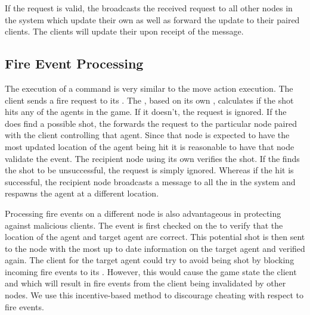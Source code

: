 	If the request is valid, the \localServer broadcasts the received request to all other nodes in the system which update their own \gamestate as well as forward the update to their paired clients. The clients will update their \gamestate upon receipt of the message.

\subsection{Fire Event Processing}

	The execution of a \fire{\position}{\direction} command is very similar to the move action execution. The client sends a fire request to its \localServer. The \localServer, based on its own \gamestate, calculates if the shot hits any of the agents in the game. If it doesn't, the request is ignored. If the \localServer does find a possible shot, the \localServer forwards the request to the particular node paired with the client controlling that agent. Since that node is expected to have the most updated location of the agent being hit it is reasonable to have that node validate the event. The recipient node using its own \gamestate verifies the shot. If the \localServer finds the shot to be unsuccessful, the request is simply ignored. Whereas if the hit is successful, the recipient node broadcasts a  message to all the \localServers in the system and respawns the agent at a different location.
	
	Processing fire events on a different node is also advantageous in protecting against malicious clients. The event is first checked on the \localServer to verify that the location of the agent and target agent are correct. This potential shot is then sent to the node with the most up to date information on the target agent and verified again. The client for the target agent could try to avoid being shot by blocking incoming fire events to its \localServer. However, this would cause the game state the client and \localServer which will result in fire events from the client being invalidated by other nodes. We use this incentive-based method to discourage cheating with respect to fire events.